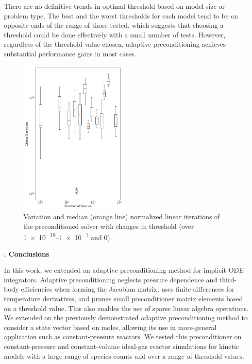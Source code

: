 \documentclass[twocolumn,10pt]{article}
\renewcommand{\section}%
              [1]%
              {%
               \bgroup%
               \flushleft%
               \small\bf%
               \stepcounter{section}%
               \arabic{section}. #1%
               \par%
               \egroup%
              }%
\newcommand{\sectionOne}[1]{\section{#1} \addvspace{10pt}}
\newcommand{\revised}[2]{#1}  %
\begin{document}
\revised{There are no definitive trends in optimal threshold based on model size or problem type. 
The best and the worst thresholds for each model tend to be on opposite ends of the range of those tested, which suggests that choosing a threshold could be done effectively with a small number of tests.
However, regardless of the threshold value chosen, adaptive preconditioning achieves substantial performance gains in most cases.}{revOne} 

\begin{figure}[htb]
\centering
\includegraphics[width=0.49\textwidth]{figures/Iterations-BoxWhisker-pressure_problem.pdf}
\caption{Variation and median (orange line) normalized linear iterations of the preconditioned solver with changes in threshold (over \numrange{1e-18}{1e-1} and 0).}
\label{fig:box_whisker_iterations}
\end{figure}

\sectionOne{Conclusions}

In this work, we extended an adaptive preconditioning method for implicit ODE integrators.
Adaptive preconditioning neglects pressure dependence and third-body efficiencies when forming the Jacobian matrix,
uses finite differences for temperature derivatives, and prunes small preconditioner matrix elements based on a threshold value.
This also enables the use of sparse linear algebra operations.
We extended on the previously demonstrated adaptive preconditioning method to consider a state vector based on moles, allowing its use in more-general application such as constant-pressure reactors.
We tested this preconditioner on constant-pressure and constant-volume ideal-gas reactor simulations for kinetic models with a large range of species counts and over a range of threshold values.
\end{document}
